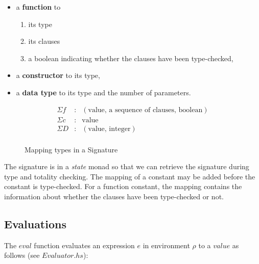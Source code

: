 \documentclass[acmsmall]{acmart}
\begin{document}
\begin{itemize}
  \item a \textbf{function} to
        \begin{enumerate}
          \item its type
          \item its clauses
          \item a boolean indicating whether the clauses have been type-checked,
        \end{enumerate}
  \item a \textbf{constructor} to its type,
  \item a \textbf{data type} to its type and the number of parameters.
\end{itemize}

\begin{figure}[H]
  \begin{equation*}
    \begin{aligned}
      \Sigma f & : & (\textrm{value, a sequence of clauses, boolean}) \\
      \Sigma c & : & \textrm{value}                                   \\
      \Sigma D & : & (\textrm{value, integer})                        \\
    \end{aligned}
  \end{equation*}
  \caption{Mapping types in a Signature}
\end{figure}

The signature is in a \emph{state} monad so that we can retrieve the signature during type and totality checking. The mapping of a constant may be added before the constant is type-checked. For a function constant, the mapping contains the information about whether the clauses have been type-checked or not.

\subsection{Evaluations}

The $eval$ function evaluates an expression $e$ in environment $\rho$ to a
$value$ as follows (see $Evaluator.hs$):
\end{document}
